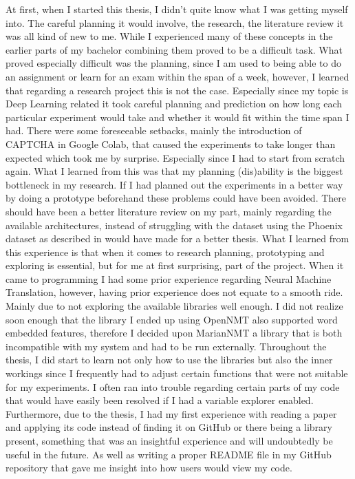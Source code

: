 At first, when I started this thesis, I didn't quite know what I was getting myself into. The careful planning it would involve, the research, the literature review it was all kind of new to me. While I experienced many of these concepts in the earlier parts of my bachelor combining them proved to be a difficult task. What proved especially difficult was the planning, since I am used to being able to do an assignment or learn for an exam within the span of a week, however, I learned that regarding a research project this is not the case. Especially since my topic is Deep Learning related it took careful planning and prediction on how long each particular experiment would take and whether it would fit within the time span I had. There were some foreseeable setbacks, mainly the introduction of CAPTCHA in Google Colab, that caused the experiments to take longer than expected which took me by surprise. Especially since I had to start from scratch again. What I learned from this was that my planning (dis)ability is the biggest bottleneck in my research. If I had planned out the experiments in a better way by doing a prototype beforehand these problems could have been avoided. There should have been a better literature review on my part, mainly regarding the available architectures, instead of struggling with the dataset using the Phoenix dataset as described in \cite{camgoz2018neural} would have made for a better thesis. What I learned from this experience is that when it comes to research planning, prototyping and exploring is essential, but for me at first surprising, part of the project.
When it came to programming I had some prior experience regarding Neural Machine Translation, however, having prior experience does not equate to a smooth ride. Mainly due to not exploring the available libraries well enough. I did not realize soon enough that the library I ended up using OpenNMT \cite{klein-etal-2017-opennmt} also supported word embedded features, therefore I decided upon MarianNMT \cite{mariannmt} a library that is both incompatible with my system and had to be run externally. Throughout the thesis, I did start to learn not only how to use the libraries but also the inner workings since I frequently had to adjust certain functions that were not suitable for my experiments. I often ran into trouble regarding certain parts of my code that would have easily been resolved if I had a variable explorer enabled. Furthermore, due to the thesis, I had my first experience with reading a paper and applying its code instead of finding it on GitHub or there being a library present, something that was an insightful experience and will undoubtedly be useful in the future. As well as writing a proper README file in my GitHub repository \cite{gijsgithub} that gave me insight into how users would view my code.
